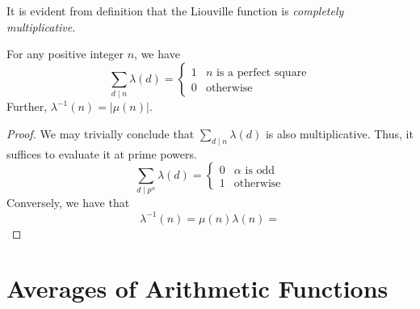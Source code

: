 It is evident from definition that the Liouville function is \textit{completely multiplicative}.
\begin{theorem}
    For any positive integer $n$, we have 
    \begin{equation*}
        \sum_{d\mid n} \lambda(d) = 
        \begin{cases}
            1 & \text{$n$ is a perfect square}\\
            0 & \text{otherwise}
        \end{cases}
    \end{equation*}
    Further, $\lambda^{-1}(n) = |\mu(n)|$.
\end{theorem}
\begin{proof}
    We may trivially conclude that $\sum_{d\mid n}\lambda(d)$ is also multiplicative. Thus, it suffices to evaluate it at prime powers. 
    \begin{equation*}
        \sum_{d\mid p^\alpha}\lambda(d) = 
        \begin{cases}
            0 & \text{$\alpha$ is odd}\\
            1 & \text{otherwise}
        \end{cases}
    \end{equation*}
    Conversely, we have that 
    \begin{equation*}
        \lambda^{-1}(n) = \mu(n)\lambda(n) = 
    \end{equation*}
\end{proof}

\section{Averages of Arithmetic Functions}
